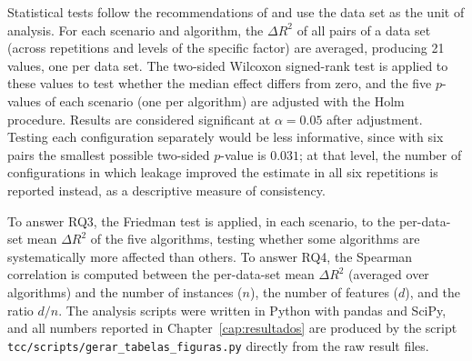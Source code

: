 Statistical tests follow the recommendations of  and use
the data set as the unit of analysis. For each scenario and algorithm, the
$\Delta R^2$ of all pairs of a data set (across repetitions and levels of the
specific factor) are averaged, producing 21 values, one per data set. The
two-sided Wilcoxon signed-rank test is applied to these values to test whether
the median effect differs from zero, and the five $p$-values of each scenario
(one per algorithm) are adjusted with the Holm procedure. Results are considered
significant at $\alpha = 0.05$ after adjustment. Testing each configuration separately would be less informative, since with six
pairs the smallest possible two-sided $p$-value is $0.031$; at that level, the number of configurations in
which leakage improved the estimate in all six repetitions is reported instead,
as a descriptive measure of consistency.

To answer RQ3, the Friedman test is applied, in each scenario, to the
per-data-set mean $\Delta R^2$ of the five algorithms, testing whether some
algorithms are systematically more affected than others. To answer RQ4, the
Spearman correlation is computed between the per-data-set mean $\Delta R^2$
(averaged over algorithms) and the number of instances ($n$), the number of
features ($d$), and the ratio $d/n$. The analysis scripts were written in Python
with pandas and SciPy, and all numbers reported in Chapter~\ref{cap:resultados}
are produced by the script \texttt{tcc/scripts/gerar\_tabelas\_figuras.py}
directly from the raw result files.
